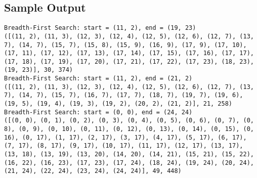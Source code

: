 \documentclass[12pt]{article}
\begin{document}
\subsection*{Sample Output}
\begin{lstlisting}[breaklines=true]
Breadth-First Search: start = (11, 2), end = (19, 23)
([(11, 2), (11, 3), (12, 3), (12, 4), (12, 5), (12, 6), (12, 7), (13, 7), (14, 7), (15, 7), (15, 8), (15, 9), (16, 9), (17, 9), (17, 10), (17, 11), (17, 12), (17, 13), (17, 14), (17, 15), (17, 16), (17, 17), (17, 18), (17, 19), (17, 20), (17, 21), (17, 22), (17, 23), (18, 23), (19, 23)], 30, 374)
Breadth-First Search: start = (11, 2), end = (21, 2)
([(11, 2), (11, 3), (12, 3), (12, 4), (12, 5), (12, 6), (12, 7), (13, 7), (14, 7), (15, 7), (16, 7), (17, 7), (18, 7), (19, 7), (19, 6), (19, 5), (19, 4), (19, 3), (19, 2), (20, 2), (21, 2)], 21, 258)
Breadth-First Search: start = (0, 0), end = (24, 24)
([(0, 0), (0, 1), (0, 2), (0, 3), (0, 4), (0, 5), (0, 6), (0, 7), (0, 8), (0, 9), (0, 10), (0, 11), (0, 12), (0, 13), (0, 14), (0, 15), (0, 16), (0, 17), (1, 17), (2, 17), (3, 17), (4, 17), (5, 17), (6, 17), (7, 17), (8, 17), (9, 17), (10, 17), (11, 17), (12, 17), (13, 17), (13, 18), (13, 19), (13, 20), (14, 20), (14, 21), (15, 21), (15, 22), (16, 22), (16, 23), (17, 23), (17, 24), (18, 24), (19, 24), (20, 24), (21, 24), (22, 24), (23, 24), (24, 24)], 49, 448)


\end{lstlisting}
\end{document}

